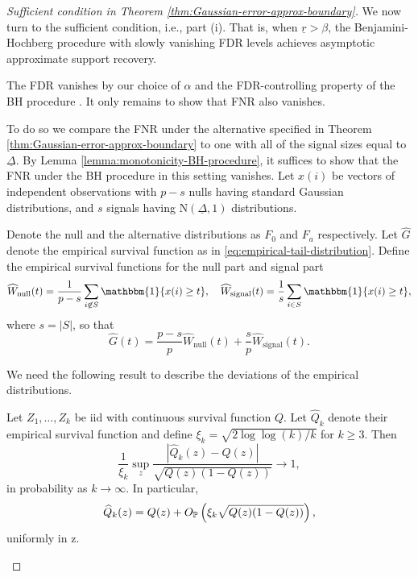 \begin{proof}[Sufficient condition in Theorem \ref{thm:Gaussian-error-approx-boundary}]
We now turn to the sufficient condition, i.e., part {\rm (i)}. That is, when $\underline{r} > \beta$, the Benjamini-Hochberg procedure with 
slowly vanishing FDR levels achieves asymptotic approximate support recovery.

The FDR vanishes by our choice of $\alpha$ and the FDR-controlling property of the BH procedure \citep{benjamini1995controlling}.
It only remains to show that FNR also vanishes.

To do so we compare the FNR under the alternative specified in Theorem \ref{thm:Gaussian-error-approx-boundary} to one with all of the signal sizes equal to $\underline{\Delta}$.
By Lemma \ref{lemma:monotonicity-BH-procedure}, it suffices to show that the FNR under the BH procedure in this setting vanishes.
Let $x(i)$ be vectors of independent observations with $p-s$ nulls having standard Gaussian distributions, and $s$ signals having $\mathrm{N}(\underline{\Delta}, 1)$ distributions.

Denote the null and the alternative distributions as $F_0$ and $F_{a}$ respectively.
Let $\widehat{G}$ denote the empirical survival function as in \eqref{eq:empirical-tail-distribution}.
Define the empirical survival functions for the null part and signal part
\begin{equation} \label{eq:empirical-survival-null-signal-Gaussian}
    \widehat{W}_\text{null}(t) = \frac{1}{p-s}\sum_{i\not\in S}\mathbbm{1}\{x(i) \ge t\},
    \quad
    \widehat{W}_\text{signal}(t) = \frac{1}{s}\sum_{i\in S}\mathbbm{1}\{x(i) \ge t\},
\end{equation}
where $s=|S|$, so that
$$
\widehat{G}(t) = \frac{p-s}{p}\widehat{W}_\text{null}(t) + \frac{s}{p}\widehat{W}_\text{signal}(t).
$$

We need the following result to describe the deviations of the empirical distributions.
\begin{lemma} \label{lemma:empirical-process}
Let $Z_1,\ldots,Z_k$ be iid with continuous survival function $Q$.
Let $\widehat{Q}_k$ denote their empirical survival function and define 
$\xi_k = \sqrt{2\log{\log{(k)}}/k}$ for $k \ge 3$. 
Then
$$
\frac{1}{\xi_k}\sup_z\frac{|\widehat{Q}_k(z) - Q(z)|}{\sqrt{Q(z)(1 - Q(z))}} \to 1,
$$
in probability as $k \to \infty$.
In particular,
$$
\widehat{Q}_k(z) = Q(z) + O_\P\left(\xi_k\sqrt{Q(z)(1 - Q(z))}\right),
$$
uniformly in z.
\end{lemma}


\end{proof}
